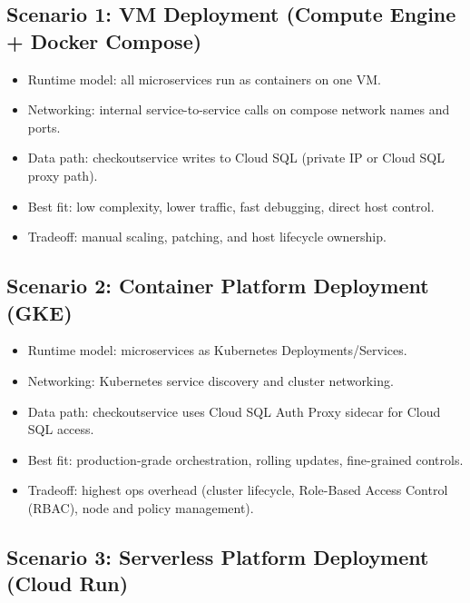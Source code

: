 \documentclass[
]{article}
\providecommand{\tightlist}{%
  \setlength{\itemsep}{0pt}\setlength{\parskip}{0pt}}
\begin{document}
\subsection{Scenario 1: VM Deployment (Compute Engine + Docker
Compose)}\label{scenario-1-vm-deployment-compute-engine-docker-compose}

\begin{itemize}
\tightlist
\item
  Runtime model: all microservices run as containers on one VM.
\item
  Networking: internal service-to-service calls on compose network names
  and ports.
\item
  Data path: checkoutservice writes to Cloud SQL (private IP or Cloud
  SQL proxy path).
\item
  Best fit: low complexity, lower traffic, fast debugging, direct host
  control.
\item
  Tradeoff: manual scaling, patching, and host lifecycle ownership.
\end{itemize}

\subsection{Scenario 2: Container Platform Deployment
(GKE)}\label{scenario-2-container-platform-deployment-gke}

\begin{itemize}
\tightlist
\item
  Runtime model: microservices as Kubernetes Deployments/Services.
\item
  Networking: Kubernetes service discovery and cluster networking.
\item
  Data path: checkoutservice uses Cloud SQL Auth Proxy sidecar for Cloud
  SQL access.
\item
  Best fit: production-grade orchestration, rolling updates,
  fine-grained controls.
\item
  Tradeoff: highest ops overhead (cluster lifecycle, Role-Based Access
  Control (RBAC), node and policy management).
\end{itemize}

\subsection{Scenario 3: Serverless Platform Deployment (Cloud
Run)}\label{scenario-3-serverless-platform-deployment-cloud-run}
\end{document}

